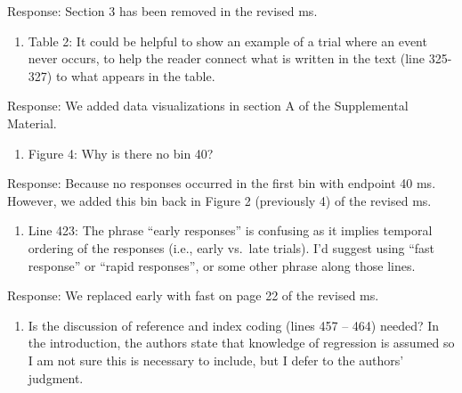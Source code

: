 \documentclass[
]{article}
\providecommand{\tightlist}{%
  \setlength{\itemsep}{0pt}\setlength{\parskip}{0pt}}
\renewenvironment{quote}{\begin{leftbar}}{\end{leftbar}}
\begin{document}
Response: Section 3 has been removed in the revised ms.

\begin{quote}
\begin{enumerate}
\def\labelenumi{\arabic{enumi}.}
\setcounter{enumi}{7}
\tightlist
\item
  Table 2: It could be helpful to show an example of a trial where an
  event never occurs, to help the reader connect what is written in the
  text (line 325-327) to what appears in the table.
\end{enumerate}
\end{quote}

Response: We added data visualizations in section A of the Supplemental
Material.

\begin{quote}
\begin{enumerate}
\def\labelenumi{\arabic{enumi}.}
\setcounter{enumi}{8}
\tightlist
\item
  Figure 4: Why is there no bin 40?
\end{enumerate}
\end{quote}

Response: Because no responses occurred in the first bin with endpoint
40 ms. However, we added this bin back in Figure 2 (previously 4) of the
revised ms.

\begin{quote}
\begin{enumerate}
\def\labelenumi{\arabic{enumi}.}
\setcounter{enumi}{9}
\tightlist
\item
  Line 423: The phrase ``early responses'' is confusing as it implies
  temporal ordering of the responses (i.e., early vs.~late trials). I'd
  suggest using ``fast response'' or ``rapid responses'', or some other
  phrase along those lines.
\end{enumerate}
\end{quote}

Response: We replaced early with fast on page 22 of the revised ms.

\begin{quote}
\begin{enumerate}
\def\labelenumi{\arabic{enumi}.}
\setcounter{enumi}{10}
\tightlist
\item
  Is the discussion of reference and index coding (lines 457 -- 464)
  needed? In the introduction, the authors state that knowledge of
  regression is assumed so I am not sure this is necessary to include,
  but I defer to the authors' judgment.
\end{enumerate}
\end{quote}
\end{document}
